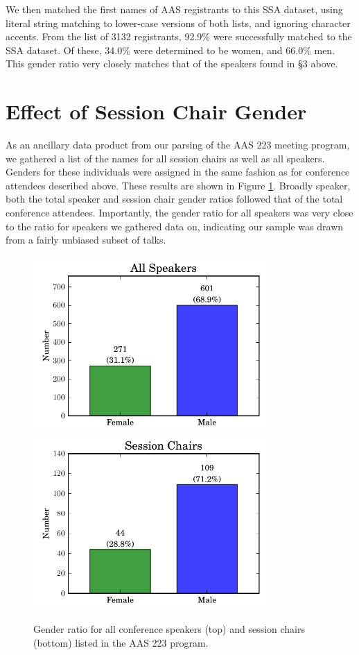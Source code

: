 \documentclass[iop]{emulateapj}
\begin{document}
We then matched the first names of AAS registrants to this SSA dataset, using literal string matching to lower-case versions of both lists, and ignoring character accents. From the list of 3132 registrants, 92.9\% were successfully matched to the SSA dataset. Of these,  34.0\% were determined to be women, and 66.0\% men. This gender ratio very closely matches that of the speakers found in \S3 above.



\section{Effect of Session Chair Gender}

As an ancillary data product from our parsing of the AAS 223 meeting program, we gathered a list of the names for all session chairs as well as all speakers. Genders for these individuals were assigned in the same fashion as for conference attendees described above. These results are shown in Figure \ref{fig:speakerchair}. Broadly speaker, both the total speaker and session chair gender ratios followed that of the total conference attendees. Importantly, the gender ratio for all speakers was very close to the ratio for speakers we gathered data on, indicating our sample was drawn from a fairly unbiased subset of talks.

\begin{figure}[!t]
\centering
\includegraphics[width=3.5in]{speakers}
\includegraphics[width=3.5in]{chairs}
\caption{Gender ratio for all conference speakers (top) and session chairs (bottom) listed in the AAS 223 program.}
\label{fig:speakerchair}
\end{figure}
\end{document}
